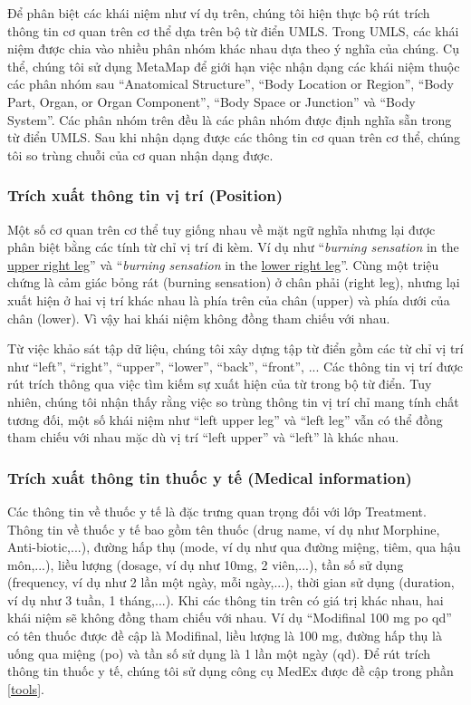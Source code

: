 Để phân biệt các khái niệm như ví dụ trên, chúng tôi hiện thực bộ rút trích thông tin cơ quan trên cơ thể dựa trên bộ từ điển UMLS. Trong UMLS, các khái niệm được chia vào nhiều phân nhóm khác nhau dựa theo ý nghĩa của chúng. Cụ thể, chúng tôi sử dụng MetaMap để giới hạn việc nhận dạng các khái niệm thuộc các phân nhóm sau ``Anatomical Structure'', ``Body Location or Region'', ``Body Part, Organ, or Organ Component'', ``Body Space or Junction'' và ``Body System''. Các phân nhóm trên đều là các phân nhóm được định nghĩa sẵn trong từ điển UMLS. Sau khi nhận dạng được các thông tin cơ quan trên cơ thể, chúng tôi so trùng chuỗi của cơ quan nhận dạng được.

\subsubsection*{Trích xuất thông tin vị trí (Position)}
Một số cơ quan trên cơ thể tuy giống nhau về mặt ngữ nghĩa nhưng lại được phân biệt bằng các tính từ chỉ vị trí đi kèm. Ví dụ như ``\textit{burning sensation} in the \underline{upper right leg}'' và ``\textit{burning sensation} in the \underline{lower right leg}''. Cùng một triệu chứng là cảm giác bỏng rát (burning sensation) ở chân phải (right leg), nhưng lại xuất hiện ở hai vị trí khác nhau là phía trên của chân (upper) và phía dưới của chân (lower). Vì vậy hai khái niệm không đồng tham chiếu với nhau.

Từ việc khảo sát tập dữ liệu, chúng tôi xây dựng tập từ điển gồm các từ chỉ vị trí như ``left'', ``right'', ``upper'', ``lower'', ``back'', ``front'', ... Các thông tin vị trí được rút trích thông qua việc tìm kiếm sự xuất hiện của từ trong bộ từ điển. Tuy nhiên, chúng tôi nhận thấy rằng việc so trùng thông tin vị trí chỉ mang tính chất tương đối, một số khái niệm như ``left upper leg'' và ``left leg'' vẫn có thể đồng tham chiếu với nhau mặc dù vị trí ``left upper'' và ``left'' là khác nhau.

\subsubsection*{Trích xuất thông tin thuốc y tế (Medical information)}
Các thông tin về thuốc y tế là đặc trưng quan trọng đối với lớp Treatment. Thông tin về thuốc y tế bao gồm tên thuốc (drug name, ví dụ như Morphine, Anti-biotic,...), đường hấp thụ (mode, ví dụ như qua đường miệng, tiêm, qua hậu môn,...), liều lượng (dosage, ví dụ như 10mg, 2 viên,...), tần số sử dụng (frequency, ví dụ như 2 lần một ngày, mỗi ngày,...), thời gian sử dụng (duration, ví dụ như 3 tuần, 1 tháng,...). Khi các thông tin trên có giá trị khác nhau, hai khái niệm sẽ không đồng tham chiếu với nhau. Ví dụ ``Modifinal 100 mg po qd'' có tên thuốc được đề cập là Modifinal, liều lượng là 100 mg, đường hấp thụ là uống qua miệng (po) và tần số sử dụng là 1 lần một ngày (qd). Để rút trích thông tin thuốc y tế, chúng tôi sử dụng công cụ MedEx được đề cập trong phần \ref{tools}.

